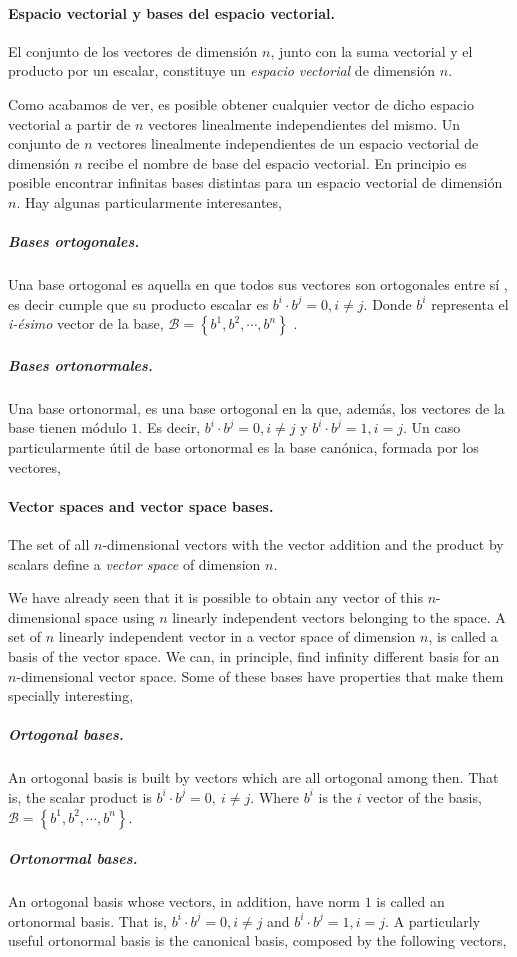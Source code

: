 \begin{paracol}{2}
\paragraph{Espacio vectorial y  bases del espacio vectorial.} El conjunto de los vectores de dimensión $n$, junto con la suma vectorial y el producto por un escalar, constituye  un  \emph{espacio vectorial} de dimensión $n$.

 Como acabamos de ver, es posible obtener cualquier vector de dicho espacio vectorial a partir de $n$ vectores linealmente independientes del mismo. Un conjunto de $n$ vectores linealmente independientes de un espacio vectorial de dimensión $n$ recibe el nombre de base del espacio vectorial. En principio es posible encontrar infinitas bases distintas para un espacio vectorial de dimensión $n$. Hay algunas particularmente interesantes,
 
 \subparagraph{Bases ortogonales.} Una base ortogonal es aquella en que todos sus vectores son ortogonales entre sí , es decir cumple que su producto escalar es $b^i\cdot b^j=0, i\neq j$. Donde  $b^i$ representa el \emph{i-ésimo} vector de la base, $\mathcal{B}=\left\lbrace b^1, b^2, \cdots, b^n  \right\rbrace $ .
 
 \subparagraph{Bases ortonormales.} Una base ortonormal, es una base ortogonal en la que, además, los vectores de la base tienen módulo $1$. Es decir, $b^i\cdot b^j=0, i\neq j$ y  $b^i\cdot b^j=1, i = j$. Un caso particularmente útil de base ortonormal es la base canónica, formada por los vectores, 
\switchcolumn
\paragraph{Vector spaces and vector space bases.} 

The set of all $n$-dimensional vectors with the vector addition and the product by scalars define a \emph{vector space} of dimension $n$.

 We have already seen that it is possible to obtain any vector of this $n$-dimensional space using $n$ linearly independent vectors belonging to the space. A set of $n$ linearly independent vector in a vector space of dimension $n$, is called a basis of the vector space. We can, in principle, find infinity different basis for an $n$-dimensional vector space. Some of these bases have properties that make them specially interesting,
 
 \subparagraph{Ortogonal bases.} An ortogonal basis is built by vectors which are all ortogonal among then. That is, the scalar product is $b^i\cdot b^j =0,\ i \neq j$. Where $b^i$ is the $i$ vector of the basis, $\mathcal{B} =\left\lbrace b^1,b^2,\cdots,b^n \right\rbrace$.

\subparagraph{Ortonormal bases.} An ortogonal basis whose vectors, in addition,  have norm $1$ is called an ortonormal basis. That is, $b^i\cdot b^j=0, i\neq j$ and  $b^i\cdot b^j=1, i = j$. A particularly useful ortonormal basis is the canonical basis, composed by the following vectors, 
\end{paracol}

